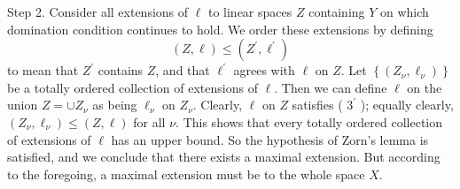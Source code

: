 \documentclass[12pt, oneside]{book}
\begin{document}
\begin{theorem}
    Step 2.
    Consider all extensions of $\ell$ to linear spaces $Z$ containing $Y$ on which domination condition continues to hold. We order these extensions by defining
    \begin{equation*}
        (Z, \ell) \leq\left(Z^{\prime}, \ell^{\prime}\right)
    \end{equation*}
    to mean that $Z^{\prime}$ contains $Z$, and that $\ell^{\prime}$ agrees with $\ell$ on $Z$.
    Let $\left\{\left(Z_\nu, \ell_\nu\right)\right\}$ be a totally ordered collection of extensions of $\ell$. Then we can define $\ell$ on the union $Z=\cup Z_\nu$ as being $\ell_\nu$ on $Z_\nu$. Clearly, $\ell$ on $Z$ satisfies ( $3^{\prime}$ ); equally clearly, $\left(Z_\nu, \ell_\nu\right) \leq(Z, \ell)$ for all $\nu$. This shows that every totally ordered collection of extensions of $\ell$ has an upper bound. So the hypothesis of Zorn's lemma is satisfied, and we conclude that there exists a maximal extension. But according to the foregoing, a maximal extension must be to the whole space $X$.
\end{theorem}
\end{document}
